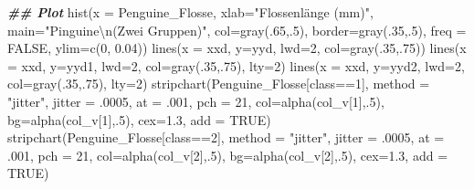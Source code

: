 \documentclass[
  ngerman,
]{book}
\newenvironment{Shaded}{\begin{snugshade}}{\end{snugshade}}
\newcommand{\AttributeTok}[1]{\textcolor[rgb]{0.77,0.63,0.00}{#1}}
\newcommand{\ConstantTok}[1]{\textcolor[rgb]{0.00,0.00,0.00}{#1}}
\newcommand{\DecValTok}[1]{\textcolor[rgb]{0.00,0.00,0.81}{#1}}
\newcommand{\DocumentationTok}[1]{\textcolor[rgb]{0.56,0.35,0.01}{\textbf{\textit{#1}}}}
\newcommand{\FloatTok}[1]{\textcolor[rgb]{0.00,0.00,0.81}{#1}}
\newcommand{\FunctionTok}[1]{\textcolor[rgb]{0.00,0.00,0.00}{#1}}
\newcommand{\NormalTok}[1]{#1}
\newcommand{\SpecialCharTok}[1]{\textcolor[rgb]{0.00,0.00,0.00}{#1}}
\newcommand{\StringTok}[1]{\textcolor[rgb]{0.31,0.60,0.02}{#1}}
\begin{document}
\begin{Shaded}
\begin{Highlighting}[]
\DocumentationTok{\#\# Plot}
\FunctionTok{hist}\NormalTok{(}\AttributeTok{x =}\NormalTok{ Penguine\_Flosse, }\AttributeTok{xlab=}\StringTok{"Flossenlänge (mm)"}\NormalTok{, }\AttributeTok{main=}\StringTok{"Pinguine}\SpecialCharTok{\textbackslash{}n}\StringTok{(Zwei Gruppen)"}\NormalTok{,}
     \AttributeTok{col=}\FunctionTok{gray}\NormalTok{(.}\DecValTok{65}\NormalTok{,.}\DecValTok{5}\NormalTok{), }\AttributeTok{border=}\FunctionTok{gray}\NormalTok{(.}\DecValTok{35}\NormalTok{,.}\DecValTok{5}\NormalTok{), }\AttributeTok{freq =} \ConstantTok{FALSE}\NormalTok{, }\AttributeTok{ylim=}\FunctionTok{c}\NormalTok{(}\DecValTok{0}\NormalTok{, }\FloatTok{0.04}\NormalTok{))}
\FunctionTok{lines}\NormalTok{(}\AttributeTok{x =}\NormalTok{ xxd, }\AttributeTok{y=}\NormalTok{yyd, }\AttributeTok{lwd=}\DecValTok{2}\NormalTok{, }\AttributeTok{col=}\FunctionTok{gray}\NormalTok{(.}\DecValTok{35}\NormalTok{,.}\DecValTok{75}\NormalTok{))}
\FunctionTok{lines}\NormalTok{(}\AttributeTok{x =}\NormalTok{ xxd, }\AttributeTok{y=}\NormalTok{yyd1, }\AttributeTok{lwd=}\DecValTok{2}\NormalTok{, }\AttributeTok{col=}\FunctionTok{gray}\NormalTok{(.}\DecValTok{35}\NormalTok{,.}\DecValTok{75}\NormalTok{), }\AttributeTok{lty=}\DecValTok{2}\NormalTok{)}
\FunctionTok{lines}\NormalTok{(}\AttributeTok{x =}\NormalTok{ xxd, }\AttributeTok{y=}\NormalTok{yyd2, }\AttributeTok{lwd=}\DecValTok{2}\NormalTok{, }\AttributeTok{col=}\FunctionTok{gray}\NormalTok{(.}\DecValTok{35}\NormalTok{,.}\DecValTok{75}\NormalTok{), }\AttributeTok{lty=}\DecValTok{2}\NormalTok{)}
\FunctionTok{stripchart}\NormalTok{(Penguine\_Flosse[class}\SpecialCharTok{==}\DecValTok{1}\NormalTok{], }\AttributeTok{method =} \StringTok{"jitter"}\NormalTok{, }\AttributeTok{jitter =}\NormalTok{ .}\DecValTok{0005}\NormalTok{, }\AttributeTok{at =}\NormalTok{ .}\DecValTok{001}\NormalTok{,}
           \AttributeTok{pch =} \DecValTok{21}\NormalTok{, }\AttributeTok{col=}\FunctionTok{alpha}\NormalTok{(col\_v[}\DecValTok{1}\NormalTok{],.}\DecValTok{5}\NormalTok{), }\AttributeTok{bg=}\FunctionTok{alpha}\NormalTok{(col\_v[}\DecValTok{1}\NormalTok{],.}\DecValTok{5}\NormalTok{), }\AttributeTok{cex=}\FloatTok{1.3}\NormalTok{, }\AttributeTok{add =} \ConstantTok{TRUE}\NormalTok{)}
\FunctionTok{stripchart}\NormalTok{(Penguine\_Flosse[class}\SpecialCharTok{==}\DecValTok{2}\NormalTok{], }\AttributeTok{method =} \StringTok{"jitter"}\NormalTok{, }\AttributeTok{jitter =}\NormalTok{ .}\DecValTok{0005}\NormalTok{, }\AttributeTok{at =}\NormalTok{ .}\DecValTok{001}\NormalTok{,}
           \AttributeTok{pch =} \DecValTok{21}\NormalTok{, }\AttributeTok{col=}\FunctionTok{alpha}\NormalTok{(col\_v[}\DecValTok{2}\NormalTok{],.}\DecValTok{5}\NormalTok{), }\AttributeTok{bg=}\FunctionTok{alpha}\NormalTok{(col\_v[}\DecValTok{2}\NormalTok{],.}\DecValTok{5}\NormalTok{), }\AttributeTok{cex=}\FloatTok{1.3}\NormalTok{, }\AttributeTok{add =} \ConstantTok{TRUE}\NormalTok{)}
\end{Highlighting}
\end{Shaded}
\end{document}
